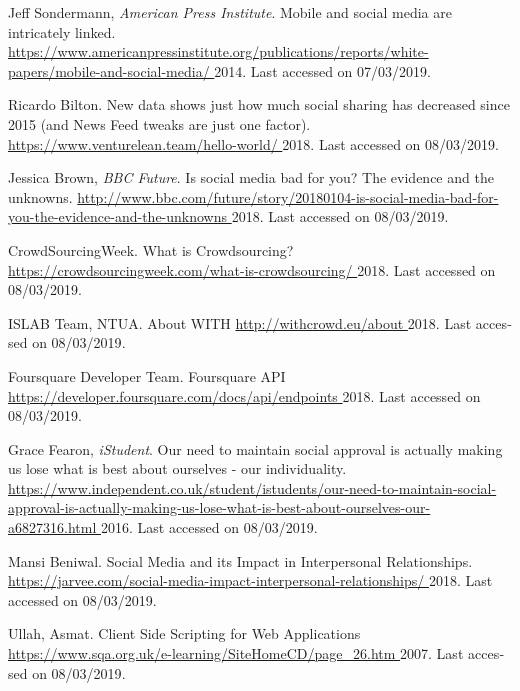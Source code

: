 
\begin{thebibliography}{1}


\bibitem{[AMP+14]} {\textlatin{
{Jeff Sondermann, {\em American Press Institute}}.
Mobile and social media are intricately linked.
\url{https://www.americanpressinstitute.org/publications/reports/white-papers/mobile-and-social-media/ }
  2014. Last accessed on 07/03/2019}}.
  
\bibitem{[VEN+18]} {\textlatin{
{Ricardo Bilton}.
New data shows just how much social sharing has decreased since 2015 (and News Feed tweaks are just one factor).
\url{https://www.venturelean.team/hello-world/ }
  2018. Last accessed on 08/03/2019}}.
  
\bibitem{[BBC+18]} {\textlatin{
{Jessica Brown, {\em BBC Future}}.
Is social media bad for you? The evidence and the unknowns.
\url{http://www.bbc.com/future/story/20180104-is-social-media-bad-for-you-the-evidence-and-the-unknowns }
  2018. Last accessed on 08/03/2019}}.

\bibitem{[CSW+18]} {\textlatin{
{CrowdSourcingWeek}.
What is Crowdsourcing?
\url{https://crowdsourcingweek.com/what-is-crowdsourcing/ }
  2018. Last accessed on 08/03/2019}}.
  
\bibitem{[WIT+18]} {\textlatin{
{ISLAB Team, NTUA}.
About WITH
\url{http://withcrowd.eu/about }
  2018. Last accessed on 08/03/2019}}.
 
\bibitem{[4SQ+18]} {\textlatin{
{Foursquare Developer Team}.
Foursquare API
\url{https://developer.foursquare.com/docs/api/endpoints }
  2018. Last accessed on 08/03/2019}}.
  
\bibitem{[IND+16]} {\textlatin{
{Grace Fearon, {\em iStudent}}.
Our need to maintain social approval is actually making us lose what is best about ourselves - our individuality.
\url{https://www.independent.co.uk/student/istudents/our-need-to-maintain-social-approval-is-actually-making-us-lose-what-is-best-about-ourselves-our-a6827316.html }
   2016. Last accessed on 08/03/2019}}.
  
\bibitem{[JAR+18]} {\textlatin{
{Mansi Beniwal}.
Social Media and its Impact in Interpersonal Relationships.
\url{https://jarvee.com/social-media-impact-interpersonal-relationships/ }
  2018. Last accessed on 08/03/2019}}.
  
\bibitem{[SQA+07]} {\textlatin{
{Ullah, Asmat}.
Client Side Scripting for Web Applications
\url{https://www.sqa.org.uk/e-learning/SiteHomeCD/page_26.htm }
  2007. Last accessed on 08/03/2019}}.
  

\end{thebibliography}
